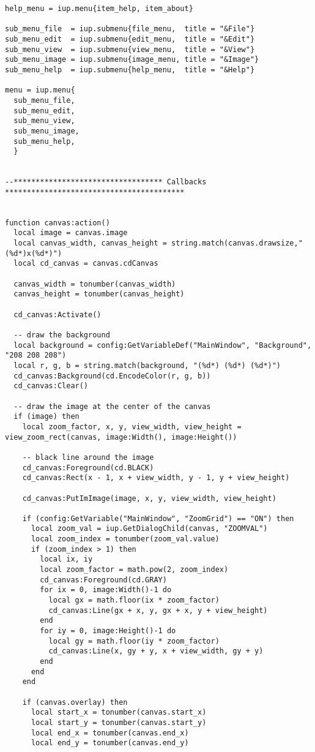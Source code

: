 \documentclass{ctexart}
\begin{document}
\begin{lstlisting}
help_menu = iup.menu{item_help, item_about}

sub_menu_file  = iup.submenu{file_menu,  title = "&File"}
sub_menu_edit  = iup.submenu{edit_menu,  title = "&Edit"}
sub_menu_view  = iup.submenu{view_menu,  title = "&View"}
sub_menu_image = iup.submenu{image_menu, title = "&Image"}
sub_menu_help  = iup.submenu{help_menu,  title = "&Help"}

menu = iup.menu{
  sub_menu_file, 
  sub_menu_edit, 
  sub_menu_view, 
  sub_menu_image,
  sub_menu_help,
  }


--********************************** Callbacks *****************************************


function canvas:action()
  local image = canvas.image
  local canvas_width, canvas_height = string.match(canvas.drawsize,"(%d*)x(%d*)")
  local cd_canvas = canvas.cdCanvas

  canvas_width = tonumber(canvas_width)
  canvas_height = tonumber(canvas_height)

  cd_canvas:Activate()

  -- draw the background 
  local background = config:GetVariableDef("MainWindow", "Background", "208 208 208")
  local r, g, b = string.match(background, "(%d*) (%d*) (%d*)")
  cd_canvas:Background(cd.EncodeColor(r, g, b))
  cd_canvas:Clear()

  -- draw the image at the center of the canvas 
  if (image) then
    local zoom_factor, x, y, view_width, view_height = view_zoom_rect(canvas, image:Width(), image:Height())

    -- black line around the image
    cd_canvas:Foreground(cd.BLACK)
    cd_canvas:Rect(x - 1, x + view_width, y - 1, y + view_height)

    cd_canvas:PutImImage(image, x, y, view_width, view_height)
    
    if (config:GetVariable("MainWindow", "ZoomGrid") == "ON") then
      local zoom_val = iup.GetDialogChild(canvas, "ZOOMVAL")
      local zoom_index = tonumber(zoom_val.value)
      if (zoom_index > 1) then
        local ix, iy
        local zoom_factor = math.pow(2, zoom_index)
        cd_canvas:Foreground(cd.GRAY)
        for ix = 0, image:Width()-1 do
          local gx = math.floor(ix * zoom_factor)
          cd_canvas:Line(gx + x, y, gx + x, y + view_height)
        end
        for iy = 0, image:Height()-1 do
          local gy = math.floor(iy * zoom_factor)
          cd_canvas:Line(x, gy + y, x + view_width, gy + y)
        end
      end
    end

    if (canvas.overlay) then
      local start_x = tonumber(canvas.start_x)
      local start_y = tonumber(canvas.start_y)
      local end_x = tonumber(canvas.end_x)
      local end_y = tonumber(canvas.end_y)


\end{lstlisting}
\end{document}
